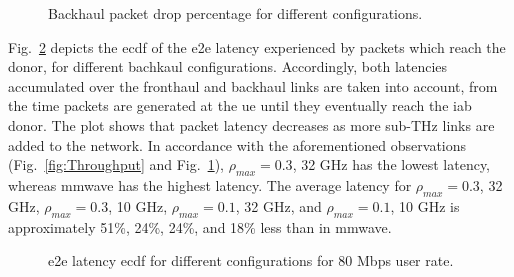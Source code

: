 \begin{figure}
    \centering
    \setlength{}
    \setlength{}
    
    \caption{Backhaul packet drop percentage for different configurations.}
    \label{fig:packetDrop}
\end{figure}

Fig.~\ref{fig:Latency} depicts the \gls{ecdf} of the \gls{e2e} latency experienced by packets which reach the donor, for different bachkaul configurations. Accordingly, both latencies accumulated over the fronthaul and backhaul links are taken into account, from the time packets are generated at the \gls{ue} until they eventually reach the \gls{iab} donor. The plot shows that packet latency decreases as more sub-THz links are added to the network. In accordance with the aforementioned observations (Fig.~\ref{fig:Throughput} and Fig.~\ref{fig:packetDrop}), $\rho_{max} = 0.3$, 32 GHz has the lowest latency, whereas \gls{mmwave} has the highest latency. The average latency for $\rho_{max} = 0.3$, 32 GHz, $\rho_{max} = 0.3$, 10 GHz, $\rho_{max} = 0.1$, 32 GHz, and $\rho_{max} = 0.1$, 10 GHz is approximately 51\%, 24\%, 24\%, and 18\% less than in \gls{mmwave}.

\begin{figure}
    \centering
    \setlength{}
    \setlength{}
    
    \caption{\Gls{e2e} latency \gls{ecdf} for different configurations for 80 Mbps user rate.}
    \label{fig:Latency}
\end{figure}

